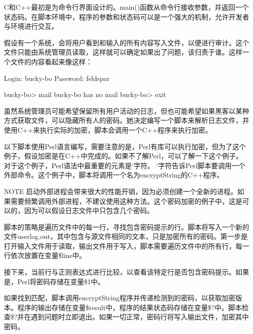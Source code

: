 C和C++最初是为命令行界面设计的。main()函数从命令行接收参数，并返回一个状态码。在脚本环境中，程序的参数和状态码可以是一个强大的机制，允许开发者与环境进行交互。


假设有一个系统，会将用户看到和输入的所有内容写入文件，以便进行审计。这个文件只能由系统管理员读取，这样就可以确定如果出了问题，该归责于谁。这样一个文件的内容看起来像这样：

\begin{shell}
Login: bucky-bo
Password: feldspar

bucky-bo> mail
bucky-bo has no mail
bucky-bo> exit
\end{shell}

虽然系统管理员可能希望保留所有用户活动的日志，但也可能希望如果黑客以某种方式获取文件，可以隐藏所有人的密码。她决定编写一个脚本来解析日志文件，并使用C++来执行实际的加密，脚本会调用一个C++程序来执行加密。

以下脚本使用Perl语言编写，需要注意的是，Perl有库可以执行加密，但为了这个例子，假设加密是在C++中完成的。如果不了解Perl，可以了解一下这个例子。对于这个例子，Perl语法中最重要的元素是`字符。 `字符告诉Perl脚本要调用一个外部命令。这个例子中，脚本将调用一个名为encryptString的C++程序。

\begin{myNotic}{NOTE}
启动外部进程会带来很大的性能开销，因为必须创建一个全新的进程。如果需要频繁调用外部进程，不建议使用这种方法。这个密码加密的例子中，这是可以的，因为可以假设日志文件中只包含几个密码。
\end{myNotic}

脚本的策略是遍历文件中的每一行，寻找包含密码提示的行。脚本将写入一个新的文件userlog.out，其中包含与源文件相同的文本，只是加密所有的密码。第一步是打开输入文件用于读取，输出文件用于写入，脚本需要遍历文件中的所有行，每一行依次放置在变量\$line中。

\begin{shell}
open (INPUT, "userlog.txt") or die "Couldn't open input file!";
open (OUTPUT, ">userlog.out") or die "Couldn't open output file!";
while ($line = <INPUT>) {
\end{shell}

接下来，当前行与正则表达式进行比较，以查看该特定行是否包含密码提示。如果是，Perl将密码存储在变量\$1中。

\begin{shell}
    if ($line =˜ m/^Password: (.*)/) {
\end{shell}

如果找到匹配，脚本调用encryptString程序并传递检测到的密码，以获取加密版本。程序的输出存储在变量\$result中，程序的结果状态码存储在变量\$?中。脚本检查\$?并在遇到问题时立即退出。如果一切正常，密码行将写入输出文件，加密其中密码。

